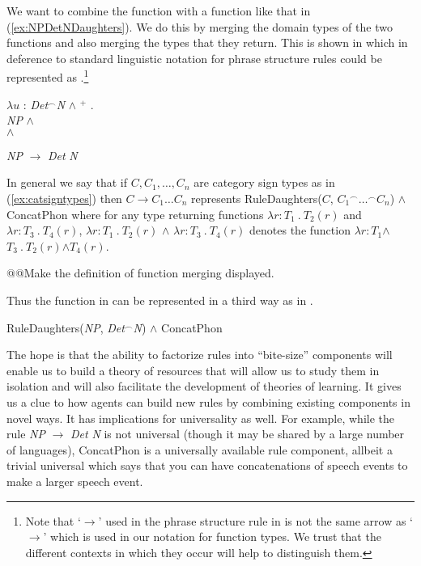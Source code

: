 We want to combine the function \preveg{} with a function like that in
(\ref{ex:NPDetNDaughters}). We do this by merging the domain types of
the two functions and also merging the types that they return.  This
is shown in  which in deference to standard linguistic
notation for phrase structure rules could be represented as
.\footnote{Note that `$\longrightarrow$' used in the phrase
  structure rule in  is not the same arrow as `$\rightarrow$'
  which is used in our notation for function types.  We trust that the
  different contexts in which they occur will help to distinguish them.}
\begin{ex} 
\begin{subex}
\item  $\lambda u$ : \textit{Det}$^{\frown}$\textit{N} \d{$\wedge$} $^+$ . \\
\hspace*{1em}\textit{NP} \d{$\wedge$}
\\
\hspace*{2.5em}\d{$\wedge$}

\item \textit{NP} $\longrightarrow$ \textit{Det} \textit{N}
\end{subex}
\label{eg:NPDetN}
\end{ex}
In general we say that if $C,C_1,\ldots,C_n$ are category sign types
as in (\ref{ex:catsigntypes}) then $C \longrightarrow C_1 \ldots C_n$ represents RuleDaughters($C$,
${C_1}^{\frown}\ldots^{\frown}C_n$) \d{\d{$\wedge$}} ConcatPhon where
for any type returning functions $\lambda r\!:\!T_1\ .\ T_2(r)$ and
$\lambda r\!:\!T_3\ .\ T_4(r)$, $\lambda r\!:\!T_1\ .\ T_2(r)$ \d{\d{$\wedge$}} $\lambda r\!:\!T_3\ .\ T_4(r)$
denotes the function $\lambda r\!:\!T_1$\d{$\wedge$}$T_3\ .\
T_2(r)$\d{$\wedge$}$T_4(r)$.  

@@Make the definition of function merging displayed.

Thus the function in \preveg{} can be
represented in a third way as in \nexteg{}.
\begin{ex} 
RuleDaughters(\textit{NP}, \textit{Det}$^{\frown}$\textit{N})
\d{\d{$\wedge$}} ConcatPhon 
\end{ex} 
The hope is that the ability to factorize rules into ``bite-size''
components will enable us to build a theory of resources
that will allow us to study them in isolation and will also facilitate
the development of theories of learning.  It gives us a clue to how agents can build new
rules by combining existing components in novel ways.  It has implications for universality
as well. For example, while the rule
\textit{NP} $\longrightarrow$ \textit{Det} \textit{N} is not universal
(though it may be shared by a large number of languages), ConcatPhon
is a universally available rule component, allbeit a trivial universal
which says that you can have concatenations of speech events to make a
larger speech event.    
     

